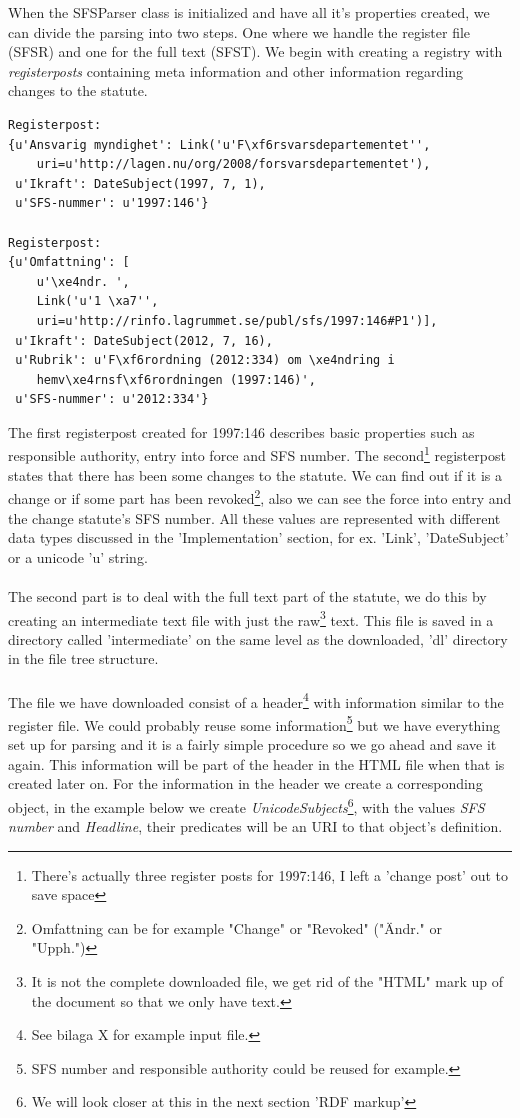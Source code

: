 When the SFSParser class is initialized and have all it’s properties created, we can divide the parsing into two steps. One where we handle the register file (SFSR) and one for the full text (SFST). We begin with creating a registry with \textit{registerposts} containing meta information and other information regarding changes to the statute.\\ 
\begin{verbatim}
Registerpost: 
{u'Ansvarig myndighet': Link('u'F\xf6rsvarsdepartementet'',
	uri=u'http://lagen.nu/org/2008/forsvarsdepartementet'), 
 u'Ikraft': DateSubject(1997, 7, 1), 
 u'SFS-nummer': u'1997:146'}

Registerpost: 
{u'Omfattning': [
	u'\xe4ndr. ', 
	Link('u'1 \xa7'',
	uri=u'http://rinfo.lagrummet.se/publ/sfs/1997:146#P1')],
 u'Ikraft': DateSubject(2012, 7, 16), 
 u'Rubrik': u'F\xf6rordning (2012:334) om \xe4ndring i 
	hemv\xe4rnsf\xf6rordningen (1997:146)', 
 u'SFS-nummer': u'2012:334'}
\end{verbatim}
\linebreak
\newline
The first registerpost created for 1997:146 describes basic properties such as responsible authority, entry into force and SFS number. The second\footnote{There's actually three register posts for 1997:146, I left a 'change post' out to save space} registerpost states that there has been some changes to the statute. We can find out if it is a change or if some part has been revoked\footnote{Omfattning can be for example "Change" or "Revoked" ("Ändr." or "Upph.")}, also we can see the force into entry and the change statute's SFS number. All these values are represented with different data types discussed in the 'Implementation' section, for ex. 'Link', 'DateSubject' or a unicode 'u' string.\\\\
The second part is to deal with the full text part of the statute, we do this by creating an intermediate text file with just the raw\footnote{It is not the complete downloaded file, we get rid of the "HTML" mark up of the document so that we only have text.} text. This file is saved in a directory called 'intermediate' on the same level as the downloaded, 'dl' directory in the file tree structure. \\\\ 
The file we have downloaded consist of a header\footnote{See bilaga X for example input file.} with information similar to the register file. We could probably reuse some information\footnote{SFS number and responsible authority could be reused for example.} but we have everything set up for parsing and it is a fairly simple procedure so we go ahead and save it again. This information will be part of the header in the HTML file when that is created later on. For the information in the header we create a corresponding object, in the example below we create \textit{UnicodeSubjects}\footnote{We will look closer at this in the next section 'RDF markup'}, with the values \textit{SFS number} and \textit{Headline}, their predicates will be an URI to that object's definition.\\
